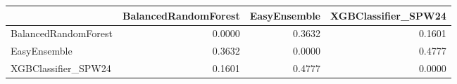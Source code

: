 \begin{tabular}{lrrr}
\toprule
 & BalancedRandomForest & EasyEnsemble & XGBClassifier_SPW24 \\
\midrule
BalancedRandomForest & 0.0000 & 0.3632 & 0.1601 \\
EasyEnsemble & 0.3632 & 0.0000 & 0.4777 \\
XGBClassifier_SPW24 & 0.1601 & 0.4777 & 0.0000 \\
\bottomrule
\end{tabular}
